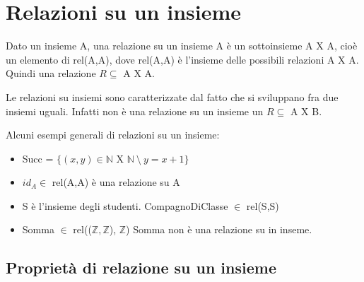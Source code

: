\newpage
\section{Relazioni su un insieme}
\begin{definition}
Dato un insieme A, una relazione su un insieme A è un sottoinsieme A X A, cioè un elemento di rel(A,A), dove rel(A,A) è l'insieme delle possibili relazioni A X A. Quindi una relazione $R \subseteq$ A X A.
\end{definition}
Le relazioni su insiemi sono caratterizzate dal fatto che si sviluppano fra due insiemi uguali. Infatti non è una relazione su un insieme un $R \subseteq$ A X B.
\begin{example}
Alcuni esempi generali di relazioni su un insieme:
\begin{itemize}
    \item Succ = $\{(x,y) \in \mathbb{N}$ X $\mathbb{N}\: \setminus\: y=x+1\}$
    \item $id_A \in$ rel(A,A) è una relazione su A
    \item S è l'insieme degli studenti. CompagnoDiClasse $\in$ rel(S,S)
    \item Somma $\in$ rel(($\mathbb{Z}, \mathbb{Z}$), $\mathbb{Z}$) Somma non è una relazione su in inseme.
\end{itemize}
\end{example}

\subsection{Proprietà di relazione su un insieme}
